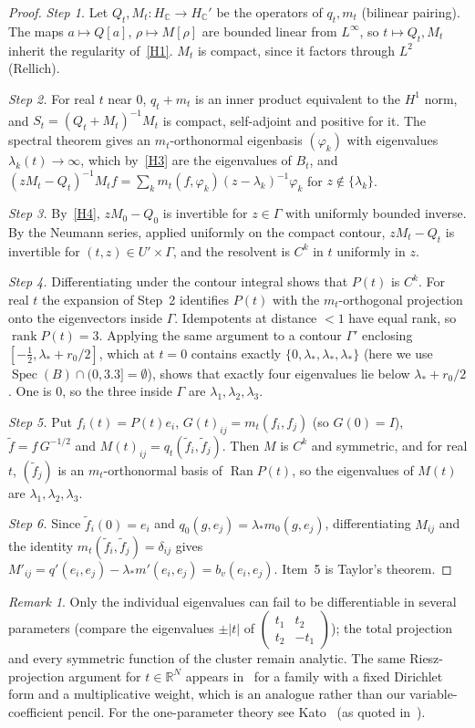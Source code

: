 \documentclass[11pt]{amsart}
\theoremstyle{definition}
\theoremstyle{remark}
\newtheorem{remark}[theorem]{Remark}
\newcommand{\R}{\mathbb{R}}
\newcommand{\C}{\mathbb{C}}
\newcommand{\rank}{\operatorname{rank}}
\newcommand{\Spec}{\operatorname{Spec}}
\newcommand{\Ran}{\operatorname{Ran}}
\newcommand{\ls}{\lambda_*}
\begin{document}
\begin{proof}
\emph{Step 1.} Let $Q_t,M_t\colon H_\C\to H_\C'$ be the operators of $q_t,m_t$ (bilinear pairing).
The maps $a\mapsto Q[a]$, $\rho\mapsto M[\rho]$ are bounded linear from $L^\infty$, so
$t\mapsto Q_t,M_t$ inherit the regularity of~\ref{H1}. $M_t$ is compact, since it factors through
$L^2$ (Rellich).

\emph{Step 2.} For real $t$ near $0$, $q_t+m_t$ is an inner product equivalent to the $H^1$
norm, and $S_t=(Q_t+M_t)^{-1}M_t$ is compact, self-adjoint and positive for it. The spectral
theorem gives an $m_t$-orthonormal eigenbasis $(\varphi_k)$ with eigenvalues $\lambda_k(t)\to\infty$,
which by~\ref{H3} are the eigenvalues of $B_t$, and
$(zM_t-Q_t)^{-1}M_tf=\sum_km_t(f,\varphi_k)(z-\lambda_k)^{-1}\varphi_k$ for $z\notin\{\lambda_k\}$.

\emph{Step 3.} By~\ref{H4}, $zM_0-Q_0$ is invertible for $z\in\Gamma$ with uniformly bounded
inverse. By the Neumann series, applied uniformly on the compact contour, $zM_t-Q_t$ is
invertible for $(t,z)\in U'\times\Gamma$, and the resolvent is $C^k$ in $t$ uniformly in $z$.

\emph{Step 4.} Differentiating under the contour integral shows that $P(t)$ is $C^k$. For real $t$
the expansion of Step~2 identifies $P(t)$ with the $m_t$-orthogonal projection onto the
eigenvectors inside $\Gamma$. Idempotents at distance $<1$ have equal rank, so
$\rank P(t)=3$. Applying the same argument to a contour $\Gamma'$ enclosing
$[-\tfrac12,\ls+r_0/2]$, which at $t=0$ contains exactly $\{0,\ls,\ls,\ls\}$ (here we use
$\Spec(B)\cap(0,3.3]=\emptyset$), shows that exactly four eigenvalues lie below $\ls+r_0/2$. One
is $0$, so the three inside $\Gamma$ are $\lambda_1,\lambda_2,\lambda_3$.

\emph{Step 5.} Put $f_i(t)=P(t)e_i$, $G(t)_{ij}=m_t(f_i,f_j)$ (so $G(0)=I$),
$\tilde f=f\,G^{-1/2}$ and $M(t)_{ij}=q_t(\tilde f_i,\tilde f_j)$. Then $M$ is $C^k$ and symmetric,
and for real $t$, $(\tilde f_j)$ is an $m_t$-orthonormal basis of $\Ran P(t)$, so the
eigenvalues of $M(t)$ are $\lambda_1,\lambda_2,\lambda_3$.

\emph{Step 6.} Since $\tilde f_i(0)=e_i$ and $q_0(g,e_j)=\ls m_0(g,e_j)$, differentiating
$M_{ij}$ and the identity $m_t(\tilde f_i,\tilde f_j)=\delta_{ij}$ gives
$M'_{ij}=q'(e_i,e_j)-\ls m'(e_i,e_j)=b_v(e_i,e_j)$. Item~5 is Taylor's theorem.
\end{proof}

\begin{remark}
Only the individual eigenvalues can fail to be differentiable in several parameters (compare the
eigenvalues $\pm|t|$ of $\left(\begin{smallmatrix}t_1&t_2\\t_2&-t_1\end{smallmatrix}\right)$); the
total projection and every symmetric function of the cluster remain analytic. The same
Riesz-projection argument for $t\in\R^N$ appears in~\cite[Prop.~2.5]{Cai26} for a family with a
fixed Dirichlet form and a multiplicative weight, which is an analogue rather than our
variable-coefficient pencil. For the one-parameter theory see Kato~\cite[Ch.~VII]{Kato}
(as quoted in~\cite[\S4.1]{Dur}).
\end{remark}
\end{document}
